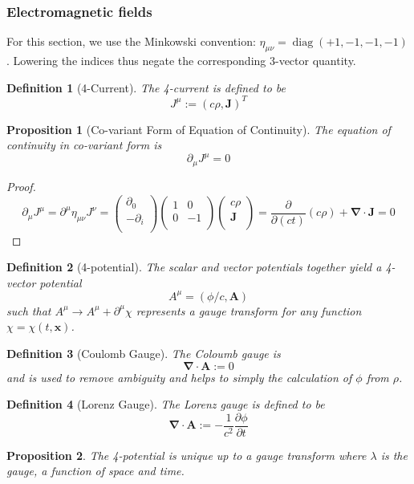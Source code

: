 \documentclass[a4paper]{article}
\DeclareMathOperator{\diag}{diag}
\theoremstyle{new}
\newtheorem{defi}{Definition}[section]
\newtheorem{prop}{Proposition}[section]
\begin{document}
\subsubsection{Electromagnetic fields}
For this section, we use the Minkowski convention: $\eta_{\mu\nu}=\diag(+1,-1,-1,-1)$. Lowering the indices thus negate the corresponding 3-vector quantity. 
\begin{defi}[4-Current]
The 4-current is defined to be
$$J^\mu:=(c\rho,\mathbf{J})^T$$
\end{defi}
\begin{prop}[Co-variant Form of Equation of Continuity]
The equation of continuity in co-variant form is
$$\partial_\mu J^\mu=0$$
\end{prop}
\begin{proof}
$$\partial_\mu J^\mu=\partial^\mu\eta_{\mu\nu}J^\nu=\begin{pmatrix}\partial_0\\-\partial_i\\\end{pmatrix}\begin{pmatrix}1&0\\0&-1\\\end{pmatrix}\begin{pmatrix}c\rho\\\mathbf{J}\\\end{pmatrix}=\frac{\partial}{\partial(ct)}(c\rho)+\boldsymbol{\nabla}\cdot\mathbf{J}=0$$
\end{proof}
\begin{defi}[4-potential]
The scalar and vector potentials together yield a 4-vector potential $$A^\mu=(\phi/c,\mathbf{A})$$
such that $A^\mu\rightarrow A^\mu+\partial^\mu\chi$ represents a gauge transform for any function $\chi=\chi(t,\mathbf{x})$.
\end{defi}
\begin{defi}[Coulomb Gauge]
The Coloumb gauge is
$$\boldsymbol{\nabla}\cdot\mathbf{A}:=0$$
and is used to remove ambiguity and helps to simply the calculation of $\phi$ from $\rho$.
\end{defi}
\begin{defi}[Lorenz Gauge]
The Lorenz gauge is defined to be
$$\boldsymbol{\nabla}\cdot\mathbf{A}:=-\frac{1}{c^2}\frac{\partial\phi}{\partial t}$$
\end{defi}
\begin{prop}
The 4-potential is unique up to a gauge transform where $\lambda$ is the gauge, a function of space and time.
\end{prop}
\end{document}
